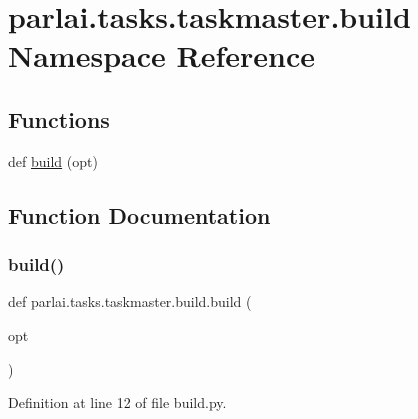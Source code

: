 \hypertarget{namespaceparlai_1_1tasks_1_1taskmaster_1_1build}{}\section{parlai.\+tasks.\+taskmaster.\+build Namespace Reference}
\label{namespaceparlai_1_1tasks_1_1taskmaster_1_1build}
\subsection*{Functions}
\begin{DoxyCompactItemize}
\item 
def \hyperlink{namespaceparlai_1_1tasks_1_1taskmaster_1_1build_a9a432c354754067775ff8c419e2e4ffe}{build} (opt)
\end{DoxyCompactItemize}


\subsection{Function Documentation}
\mbox{\label{namespaceparlai_1_1tasks_1_1taskmaster_1_1build_a9a432c354754067775ff8c419e2e4ffe}} 
\subsubsection{\texorpdfstring{build()}{build()}}
{\footnotesize\ttfamily def parlai.\+tasks.\+taskmaster.\+build.\+build (\begin{DoxyParamCaption}\item[{}]{opt }\end{DoxyParamCaption})}



Definition at line 12 of file build.\+py.

